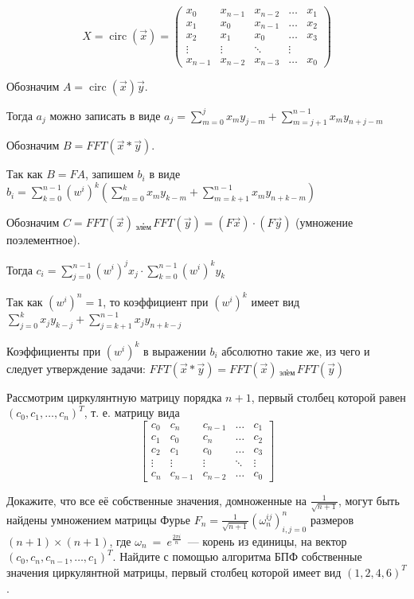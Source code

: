 \documentclass[a4paper,12pt]{article}
\DeclareMathOperator{\circul}{circ}
\begin{document}
\begin{solution}
	\begin{equation*}
	X = \circul(\vec{x}) = \left(
	\begin{array}{ccccc}
	x_0 & x_{n-1} & x_{n-2} & \ldots & x_1\\
	x_1 & x_0 & x_{n-1} & \ldots & x_2\\
	x_2 & x_1 & x_0 & \ldots & x_3\\
	\vdots & \vdots & \ddots & \vdots\\
	x_{n-1} & x_{n-2} & x_{n-3} & \ldots & x_0
	\end{array}
	\right)
	\end{equation*}
	
Обозначим $A = \circul(\vec{x})\vec{y}$.

Тогда $a_j$ можно записать в виде $a_j = \displaystyle \sum_{m=0}^{j} x_m y_{j-m} + \displaystyle \sum_{m = j+1}^{n-1} x_m y_{n+j-m}$

Обозначим $B = FFT(\vec{x}*\vec{y})$.

Так как $B = FA$, запишем $b_i$ в виде $b_i = \displaystyle \sum_{k=0}^{n-1} (w^i)^k \left( \displaystyle \sum_{m=0}^{k} x_m y_{k-m} + \displaystyle \sum_{m=k+1}^{n-1} x_m y_{n+k-m} \right)$
	
Обозначим $C = FFT(\vec{x}) \underset{\text{элем}}{\cdot} FFT(\vec{y}) = (F\vec{x}) \cdot (F\vec{y})$ (умножение поэлементное).

Тогда $c_i = \displaystyle \sum_{j=0}^{n-1} (w^i)^j x_j \cdot \displaystyle \sum_{k=0}^{n-1} (w^i)^k y_k$

Так как $(w^i)^n = 1$, то коэффициент при $(w^i)^k$ имеет вид $\displaystyle \sum_{j=0}^{k} x_j y_{k-j} + \displaystyle \sum_{j=k+1}^{n-1} x_j y_{n+k-j}$
	
Коэффициенты при $(w^i)^k$ в выражении $b_i$ абсолютно такие же, из чего и следует утверждение задачи: $FFT(\vec{x}*\vec{y}) = FFT(\vec{x}) \underset{\text{элем}}{\cdot} FFT(\vec{y})$
	
\end{solution}

\begin{task}
	Рассмотрим циркулянтную матрицу порядка $n+1$, первый столбец которой равен $(c_0, c_1, \dotsc, c_n)^T$, т. е. матрицу вида
	$$\begin{bmatrix}
	c_0 & c_n & c_{n-1} & \dots & c_1 \\
	c_1 & c_0 & c_n & \dots & c_2 \\ 
	c_2 & c_1 & c_0 & \dots & c_3 \\ 
	\vdots & \vdots & \vdots & \ddots & \vdots \\ 
	c_n & c_{n-1} & c_{n-2} & \dots & c_0 \end{bmatrix}$$
	
	Докажите, что все её собственные значения, домноженные на $\frac{1}{\sqrt{n+1}}$, могут быть найдены умножением матрицы Фурье $F_n = \frac{1}{\sqrt{n+1}}\left(\omega_n^{ij}\right)_{i, j = 0}^{n}$ размеров $(n+1)\times (n+1)$, где $\omega_n~=~e^{\frac{2\pi i}{n}}$~--- корень из единицы, на вектор $(c_0, c_n, c_{n-1},\dotsc, c_1)^T$. Найдите с помощью алгоритма БПФ собственные значения циркулянтной матрицы, первый столбец которой имеет вид $(1, 2, 4, 6)^T$.
\end{task}
\end{document}
